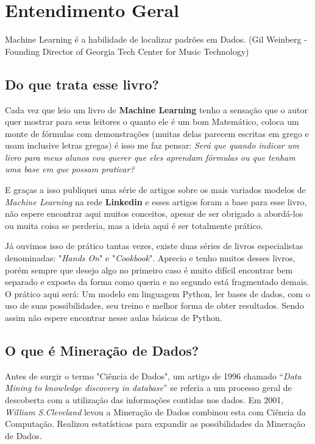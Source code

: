 \chapter{Entendimento Geral}

\begin{remark}
Machine Learning é a habilidade de localizar padrões em Dados. (Gil Weinberg - Founding Director of Georgia Tech Center for Music Technology) 
\end{remark}

\section{Do que trata esse livro?}
Cada vez que leio um livro de \textbf{Machine Learning} tenho a sensação que o autor quer mostrar para seus leitores o quanto ele é um bom Matemático, coloca um monte de fórmulas com demonstrações (muitas delas parecem escritas em grego e usam inclusive letras gregas) é isso me faz pensar: \textit{Será que quando indicar um livro para meus alunos vou querer que eles aprendam fórmulas ou que tenham uma base em que possam praticar?} 

E graças a isso publiquei uma série de artigos sobre os mais variados modelos de \textit{Machine Learning} na rede \textbf{Linkedin} e esses artigos foram a base para esse livro, não espere encontrar aqui muitos conceitos, apesar de ser obrigado a abordá-los ou muita coisa se perderia, mas a ideia aqui é ser totalmente prático.

Já ouvimos isso de prático tantas vezes, existe duas séries de livros especialistas denominadas: "\textit{Hands On}" e "\textit{Cookbook}". Aprecio e tenho muitos desses livros, porém sempre que desejo algo no primeiro caso é muito difícil encontrar bem separado e exposto da forma como queria e no segundo está fragmentado demais. O prático aqui será: Um modelo em linguagem Python, ler bases de dados, com o uso de suas possibilidades, seu treino e melhor forma de obter resultados. Sendo assim não espere encontrar nesse aulas básicas de Python.

\section{O que é Mineração de Dados?}
Antes de surgir o termo "Ciência de Dados", um artigo de 1996 chamado “\textit{Data Mining to knowledge discovery in database}” se referia a um processo geral de descoberta com a utilização das informações contidas nos dados. Em 2001, \textit{William S.Cleveland} levou a Mineração de Dados combinou esta com Ciência da Computação. Realizou estatísticas para expandir as possibilidades da Mineração de Dados.


